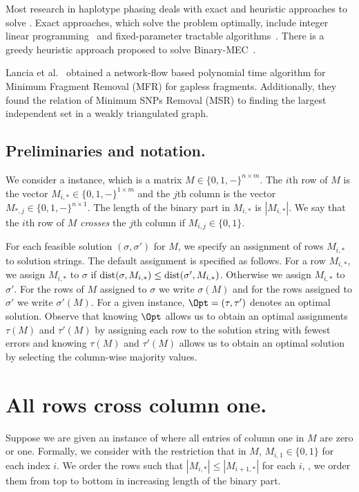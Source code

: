 Most research in haplotype phasing deals with exact and heuristic approaches to solve \BMEC.
Exact approaches, which solve the problem optimally, include integer linear programming~\cite{FM12_solving} and fixed-parameter tractable algorithms~\cite{HCP+10_optimal, PZD+15_hapcol}.
There is a greedy heuristic approach proposed to solve Binary-MEC~\cite{BB08_hapcut}. 

Lancia et al.~\cite{LBI+01_snps} obtained a network-flow based polynomial time algorithm for Minimum Fragment Removal (MFR) for gapless fragments.
Additionally, they found the relation of Minimum SNPs Removal (MSR) to finding the largest independent set in a weakly triangulated graph.

\subsection{Preliminaries and notation.}\label{sec:prelim}

We consider a \GMEC instance, which is a matrix $M \in \{0,1, -\}^{n \times m}$.
The $i$th row of $M$ is the vector $M_{i,*} \in \{0,1, -\}^{1 \times m}$ and the $j$th column is the vector $M_{*,j} \in \{0,1, -\}^{n \times 1}$.
The length of the binary part in $M_{i,*}$ is $|M_{i,*}|$. 
We say that the $i$th row of $M$ \emph{crosses} the $j$th column if $M_{i,j} \in \{0,1\}$.

For each feasible solution $(\sigma,\sigma')$ for $M$, we specify an assignment of rows $M_{i,*}$ to solution strings.
The default assignment is specified as follows.
For a row $M_{i,*}$, we assign $M_{i,*}$ to $\sigma$ if $\mathrm{dist}(\sigma,M_{i,*}) \le \mathrm{dist}(\sigma',M_{i,*})$.
Otherwise we assign $M_{i,*}$ to $\sigma'$.
For the rows of $M$ assigned to $\sigma$ we write $\sigma(M)$ and for the rows assigned to $\sigma'$ we write $\sigma'(M)$.
For a given instance, $\Opt = (\tau, \tau')$ denotes an optimal solution.
Observe that knowing $\Opt$ allows us to obtain an optimal assignments $\tau(M)$ and $\tau'(M)$ by assigning each row to the solution string with fewest errors and knowing $\tau(M)$ and $\tau'(M)$ allows us to obtain an optimal solution by selecting the column-wise majority values.

\section{All rows cross column one.}\label{sec:one-column}
Suppose we are given an instance of \GMEC where all entries of column one in $M$ are zero or one.
Formally, we consider \GMEC with the restriction that in $M$, $M_{i,1} \in \{0,1\}$ for each index $i$.
We order the rows such that $|M_{i,*}| \le |M_{i+1,*}|$ for each $i$, \ie, we order them from top to bottom in increasing length of the binary part.


